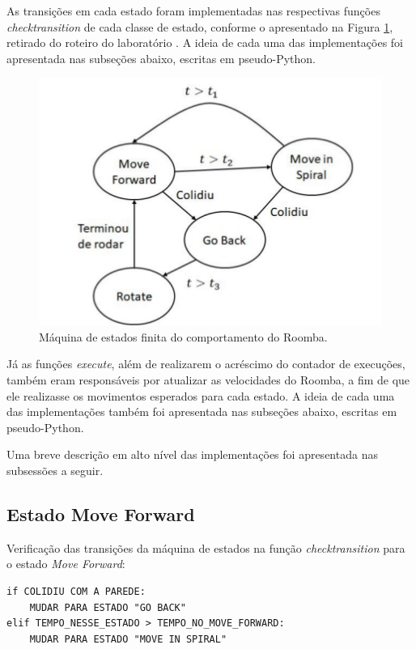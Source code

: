 \documentclass[conference]{IEEEtran}
\begin{document}
As transições em cada estado foram implementadas nas respectivas funções \textit{check\underline{\space}transition} de cada classe de estado, conforme o apresentado na Figura \ref{state_machine}, retirado do roteiro do laboratório \cite{b1}. A ideia de cada uma das implementações foi apresentada nas subseções abaixo, escritas em pseudo-Python.

\begin{figure}[htbp]
\centerline{\includegraphics[scale=0.4]{maquina_estados.png}}
\caption{Máquina de estados finita do comportamento do Roomba.}
\label{state_machine}
\end{figure}

Já as funções \textit{execute}, além de realizarem o acréscimo do contador de execuções, também eram responsáveis por atualizar as velocidades do Roomba, a fim de que ele realizasse os movimentos esperados para cada estado. A ideia de cada uma das implementações também foi apresentada nas subseções abaixo, escritas em pseudo-Python.

Uma breve descrição em alto nível das implementações foi apresentada nas subsessões a seguir.

\subsection{Estado Move Forward}
Verificação das transições da máquina de estados na função \textit{check\underline{\space}transition} para o estado \textit{Move Forward}:
\begin{lstlisting}
if COLIDIU COM A PAREDE:
	MUDAR PARA ESTADO "GO BACK"
elif TEMPO_NESSE_ESTADO > TEMPO_NO_MOVE_FORWARD:
	MUDAR PARA ESTADO "MOVE IN SPIRAL"
\end{lstlisting}
\end{document}
